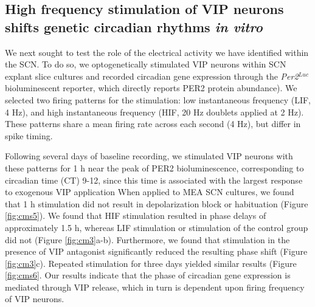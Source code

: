 \subsection*{High frequency stimulation of VIP neurons shifts genetic circadian rhythms \textit{in vitro}}


We next sought to test the role of the electrical activity we have identified within the SCN.
To do so, we optogenetically stimulated VIP neurons within SCN explant slice cultures and recorded circadian gene expression through the \textit{Per2}$^{Luc}$ bioluminescent reporter, which directly reports PER2 protein abundance).
We selected two firing patterns for the stimulation: low instantaneous frequency (LIF, 4 Hz), and high instantaneous frequency (HIF, 20 Hz doublets applied at 2 Hz).
These patterns share a mean firing rate across each second (4 Hz), but differ in spike timing.

Following several days of baseline recording, we stimulated VIP neurons with these patterns for 1 h near the peak of PER2 bioluminescence, corresponding to circadian time (CT) 9-12, since this time is associated with the largest response to exogenous VIP application \cite{An2011}
When applied to MEA SCN cultures, we found that 1 h stimulation did not result in depolarization block or habituation (Figure \ref{fig:cms5}).
We found that HIF stimulation resulted in phase delays of approximately 1.5 h, whereas LIF stimulation or stimulation of the control group did not (Figure \ref{fig:cm3}a-b). 
Furthermore, we found that stimulation in the presence of VIP antagonist significantly reduced the resulting phase shift (Figure \ref{fig:cm3}c).
Repeated stimulation for three days yielded similar results (Figure \ref{fig:cms6}.
Our results indicate that the phase of circadian gene expression is mediated through VIP release, which in turn is dependent upon firing frequency of VIP neurons.


